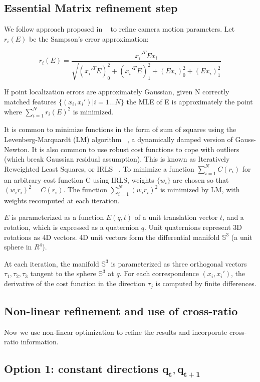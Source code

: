 \documentclass[10pt]{article}         %
\begin{document}
\subsection{Essential Matrix refinement step}

We follow approach proposed in ~\cite{Botterill-etal-2011c} to refine
camera motion parameters. Let $r_i(E)$ be the Sampson's error
approximation:

\[
r_i(E) = \frac{x_i'^TEx_i}{\sqrt{(x_i'^TE)^2_0+(x_i'^TE)^2_1+(Ex_i)^2_0+(Ex_i)^2_1}}
\]

If point localization errors are approximately Gaussian, given N
correctly matched features $\{(x_i,x_i') | i=1\ldots N\}$ the MLE of E is approximately
the point where $\sum_{i=1}^{N} r_i(E)^2$ is minimized.

It is common to minimize functions in the form of sum of squares using
the Levenberg-Marquardt (LM) algorithm ~\cite{marquardt1963algorithm},
a dynamically damped version of Gauss-Newton.  It is also common to
use robust cost functions to cope with outliers (which break Gaussian
residual assumption).  This is known as Iteratively Reweighted Least
Squares, or IRLS ~\cite{Hartley2004}.  To minimize a function
$\sum_{i=1}^N C(r_i)$ for an arbitrary cost function C using IRLS,
weights $\{w_i\}$ are chosen so that $(w_ir_i)^2=C(r_i)$. The function
$\sum_{i=1}^N (w_ir_i)^2$ is minimized by LM, with weights recomputed
at each iteration.

$E$ is parameterized as a function $E(q,t)$ of a unit translation
vector $t$, and a rotation, which is expressed as a quaternion
$q$. Unit quaternions represent 3D rotations as 4D vectors. 4D unit
vectors form the differential manifold $\mathbb{S}^3$ (a unit sphere
in $R^4$).

At each iteration, the manifold $\mathbb{S}^3$ is parameterized as
three orthogonal vectors $\tau_1,\tau_2,\tau_3$ tangent to the sphere
$\mathbb{S}^3$ at $q$.  For each correspondence $(x_i,x_i')$, the
derivative of the cost function in the direction $\tau_j$ is computed
by finite differences.

\subsection{Non-linear refinement and use of cross-ratio}
Now we use non-linear optimization to refine the results and
incorporate cross-ratio information.

\subsection{Option 1: constant directions $\mathbf{q_t}, \mathbf{q_{t+1}}$}
\end{document}
